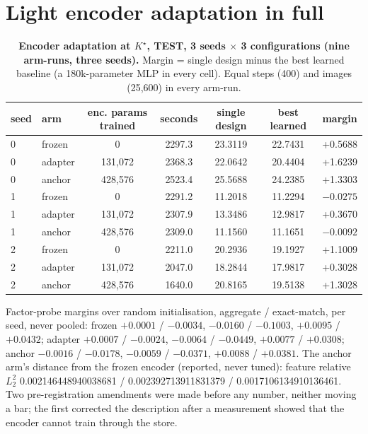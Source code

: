 \documentclass{article} %
\newcommand{\Kstar}{\ensuremath{K^{\star}}}
\begin{document}
\section{Light encoder adaptation in full}
\label{app:adapt}

\begin{table}[h]
\centering\small
\caption{\textbf{Encoder adaptation at $\Kstar$, TEST, 3 seeds $\times$ 3 configurations (nine
arm-runs, three seeds).} Margin = single design minus the best learned baseline (a 180k-parameter
MLP in every cell). Equal steps (400) and images (25,600) in every arm-run.}
\label{tab:adapt}
\setlength{\tabcolsep}{3pt}
\begin{tabular}{llccccc}
\toprule
seed & arm & enc. params trained & seconds & single design & best learned & margin \\
\midrule
0 & frozen & 0 & 2297.3 & 23.3119 & 22.7431 & +0.5688 \\
0 & adapter & 131,072 & 2368.3 & 22.0642 & 20.4404 & +1.6239 \\
0 & anchor & 428,576 & 2523.4 & 25.5688 & 24.2385 & +1.3303 \\
1 & frozen & 0 & 2291.2 & 11.2018 & 11.2294 & $-0.0275$ \\
1 & adapter & 131,072 & 2307.9 & 13.3486 & 12.9817 & +0.3670 \\
1 & anchor & 428,576 & 2309.0 & 11.1560 & 11.1651 & $-0.0092$ \\
2 & frozen & 0 & 2211.0 & 20.2936 & 19.1927 & +1.1009 \\
2 & adapter & 131,072 & 2047.0 & 18.2844 & 17.9817 & +0.3028 \\
2 & anchor & 428,576 & 1640.0 & 20.8165 & 19.5138 & +1.3028 \\
\bottomrule
\end{tabular}
\end{table}

\noindent Factor-probe margins over random initialisation, aggregate / exact-match, per seed, never
pooled: frozen $+0.0001$ / $-0.0034$, $-0.0160$ / $-0.1003$, $+0.0095$ / $+0.0432$; adapter
$+0.0007$ / $-0.0024$, $-0.0064$ / $-0.0449$, $+0.0077$ / $+0.0308$; anchor $-0.0016$ / $-0.0178$,
$-0.0059$ / $-0.0371$, $+0.0088$ / $+0.0381$. The anchor arm's distance from the frozen encoder
(reported, never tuned): feature relative $L_2^2$ 0.002146448940038681 / 0.002392713911831379 /
0.0017106134910136461. %
Two pre-registration amendments were made before any number, neither moving a bar; the first
corrected the description after a measurement showed that the encoder cannot train through the
store. %
\end{document}

